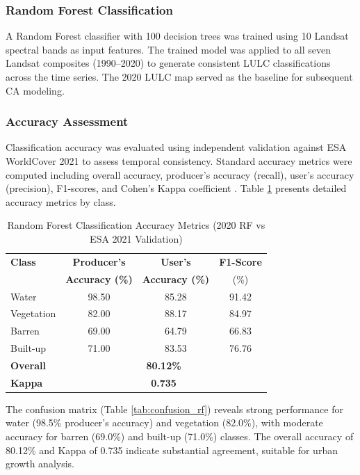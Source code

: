 \documentclass[12pt,a4paper]{article}
\begin{document}
\subsubsection{Random Forest Classification}
A Random Forest classifier \cite{breiman2001, belgiu2016} with 100 decision trees was trained using 10 Landsat spectral bands as input features. The trained model was applied to all seven Landsat composites (1990--2020) to generate consistent LULC classifications across the time series. The 2020 LULC map served as the baseline for subsequent CA modeling.

\subsubsection{Accuracy Assessment}
Classification accuracy was evaluated using independent validation against ESA WorldCover 2021 to assess temporal consistency. Standard accuracy metrics were computed including overall accuracy, producer's accuracy (recall), user's accuracy (precision), F1-scores, and Cohen's Kappa coefficient \cite{landis1977}. Table \ref{tab:rf_accuracy} presents detailed accuracy metrics by class.

\begin{table}[H]
\caption{Random Forest Classification Accuracy Metrics (2020 RF vs ESA 2021 Validation)}
\label{tab:rf_accuracy}
\centering
\small
\begin{tabular}{lccc}
\toprule
\textbf{Class} & \textbf{Producer's} & \textbf{User's} & \textbf{F1-Score} \\
 & \textbf{Accuracy (\%)} & \textbf{Accuracy (\%)} & (\%) \\
\midrule
Water & 98.50 & 85.28 & 91.42 \\
Vegetation & 82.00 & 88.17 & 84.97 \\
Barren & 69.00 & 64.79 & 66.83 \\
Built-up & 71.00 & 83.53 & 76.76 \\
\midrule
\textbf{Overall} & \multicolumn{3}{c}{\textbf{80.12\%}} \\
\textbf{Kappa} & \multicolumn{3}{c}{\textbf{0.735}} \\
\bottomrule
\end{tabular}
\end{table}

The confusion matrix (Table \ref{tab:confusion_rf}) reveals strong performance for water (98.5\% producer's accuracy) and vegetation (82.0\%), with moderate accuracy for barren (69.0\%) and built-up (71.0\%) classes. The overall accuracy of 80.12\% and Kappa of 0.735 indicate substantial agreement, suitable for urban growth analysis.
\end{document}
